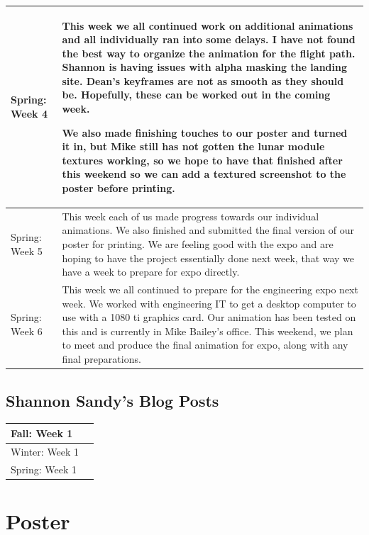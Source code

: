 \documentclass[onecolumn, draftclsnofoot,10pt, compsoc]{IEEEtran}
\begin{document}
\begin{longtable} {|p{1.5cm}|p{13.5cm}|}
Spring: Week 4 & 
This week we all continued work on additional animations and all individually ran into some delays. I have not found the best way to organize the animation for the flight path. Shannon is having issues with alpha masking the landing site. Dean's keyframes are not as smooth as they should be. Hopefully, these can be worked out in the coming week. 

We also made finishing touches to our poster and turned it in, but Mike still has not gotten the lunar module textures working, so we hope to have that finished after this weekend so we can add a textured screenshot to the poster before printing. 
\\ \hline

Spring: Week 5 & 
This week each of us made progress towards our individual animations. We also finished and submitted the final version of our poster for printing. We are feeling good with the expo and are hoping to have the project essentially done next week, that way we have a week to prepare for expo directly. 
\\ \hline

Spring: Week 6 & This week we all continued to prepare for the engineering expo next week. We worked with engineering IT to get a desktop computer to use with a 1080 ti graphics card. Our animation has been tested on this and is currently in Mike Bailey's office. This weekend, we plan to meet and produce the final animation for expo, along with any final preparations. 
\\ \hline

\end{longtable}


\subsection* {Shannon Sandy's Blog Posts}
\begin{longtable} {|p{1.5cm}|p{13.5cm}|} \hline
Fall: Week 1 & \\ \hline
Winter: Week 1 & \\ \hline
Spring: Week 1 & \\ \hline
\end{longtable}

\section{Poster}

\end{document}
